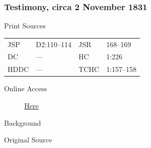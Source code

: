 {		%
		\subsubsection{Testimony, circa 2 November 1831}
			\label{EMS-1831-JS-CIR-2-NOV-1831-TEST}
		
			\begin{description}
				\item[Print Sources]
			\end{description}

				\begin{tabular}{p{0.5in}p{1in}p{0.5in}p{1in}}
				JSP	 	& D2:110--114	& JSR 		& 168--169 \\
				DC	 	& --- 			& HC 		& 1:226 \\
				HDDC 	& ---			& TCHC 		& 1:157--158 \\
				\end{tabular}
			
			\begin{description}
				\item[Online Access] \href{https://www.josephsmithpapers.org/paper-summary/testimony-circa-2-november-1831/1}{Here}
			\end{description}
			
			\begin{description}
				\item[Background]
			\end{description}
			
			
			\begin{description}
				\item[Original Source]
			\end{description}
			
			
}
